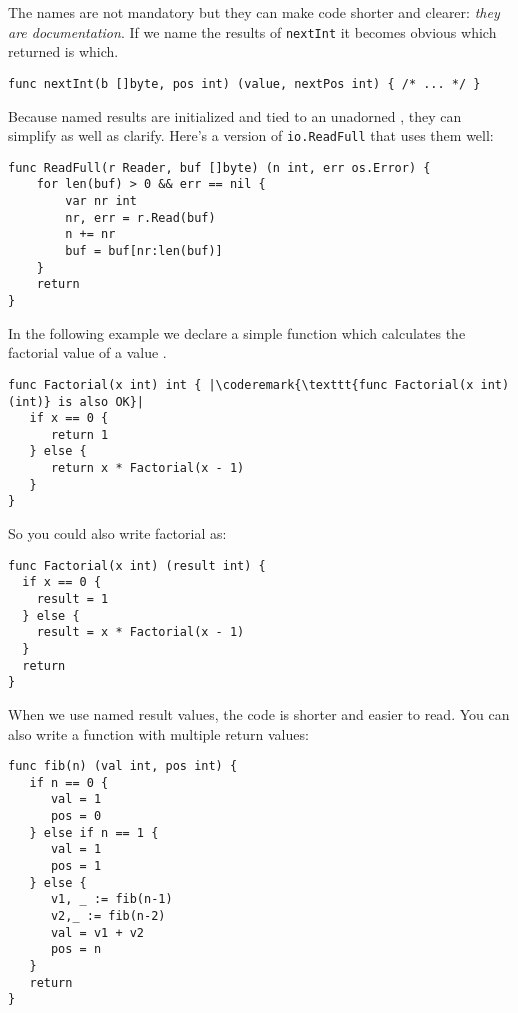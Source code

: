 The names are not mandatory but they can make code shorter and clearer:
\emph{they are documentation}. 
If we name the results of \lstinline{nextInt} it becomes obvious which
returned  is which.

\begin{lstlisting}
func nextInt(b []byte, pos int) (value, nextPos int) { /* ... */ }
\end{lstlisting}
Because named results are initialized and tied to an unadorned
,
they can simplify as well as clarify. Here's a version of
\lstinline{io.ReadFull} that uses them well:

\begin{lstlisting}
func ReadFull(r Reader, buf []byte) (n int, err os.Error) {
    for len(buf) > 0 && err == nil {
        var nr int
        nr, err = r.Read(buf)
        n += nr
        buf = buf[nr:len(buf)]
    }
    return
}
\end{lstlisting}

In the following example we declare a simple function which calculates
the factorial value of a value .

\begin{lstlisting}
func Factorial(x int) int { |\coderemark{\texttt{func Factorial(x int) (int)} is also OK}|
   if x == 0 {
      return 1
   } else {
      return x * Factorial(x - 1)
   }
}
\end{lstlisting}
So you could also write factorial as:
\begin{lstlisting}
func Factorial(x int) (result int) {
  if x == 0 {
    result = 1	
  } else {
    result = x * Factorial(x - 1)
  }
  return
}
\end{lstlisting}
When we use named result values, the code is shorter and
easier to read.
You can also write a function with multiple return values:
\begin{lstlisting}
func fib(n) (val int, pos int) {
   if n == 0 {
      val = 1
      pos = 0
   } else if n == 1 {
      val = 1
      pos = 1
   } else {
      v1, _ := fib(n-1)
      v2,_ := fib(n-2)
      val = v1 + v2
      pos = n
   }
   return
}
\end{lstlisting}

